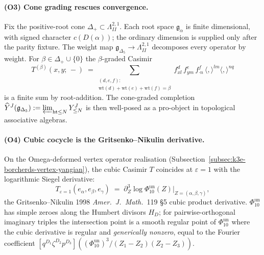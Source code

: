 \paragraph{(O3) Cone grading rescues convergence.}
Fix the positive-root cone $\Delta_+\subset\Lambda^{2,1}_{II}$. Each root space
$\mathfrak g_\alpha$ is finite dimensional, with signed character \(c(D(\alpha))\);
the ordinary dimension is supplied only after the parity fixture. The weight map
$\mathfrak g_{\Delta_5}\to\Lambda^{2,1}_{II}$ decomposes every operator by weight.
For $\beta\in\Delta_+\cup\{0\}$ the $\beta$-graded Casimir
\[
 T^{(\beta)}(x,y;\,-) \;=\!\!\sum_{\substack{(d,e,f):\\\mathrm{wt}(d)+\mathrm{wt}(e)+\mathrm{wt}(f)=\beta}}\!\!
 f^{d}_{xl}\,f^{e}_{ym}\,f^{f}_{\cdot n}\,\langle,\rangle^{lm}\langle,\rangle^{nq}
\]
is a finite sum by root-addition. The cone-graded completion
$\widehat Y^J(\mathfrak g_{\Delta_5}) := \varprojlim_{\mathrm{ht}\le N} Y^J_{\le N}$
is then well-posed as a pro-object in topological associative algebras.

\paragraph{(O4) Cubic cocycle is the Gritsenko--Nikulin derivative.}
On the Omega-deformed vertex operator realisation
(Subsection~\ref{subsec:k3e-borcherds-vertex-yangian}), the cubic Casimir
$T$ coincides at $\varepsilon=1$ with the logarithmic Siegel derivative:
\[
 T_{\varepsilon=1}(e_\alpha,e_\beta,e_\gamma)
 \;=\; \partial^3_Z\log\Phi_{10}^{\mathrm{un}}(Z)\big|_{Z=(\alpha,\beta,\gamma)},
\]
the Gritsenko--Nikulin 1998 \emph{Amer.\ J.\ Math.}~119 \S5 cubic product
derivative. \(\Phi_{10}^{\mathrm{un}}\) has simple zeroes along the Humbert divisors
$H_D$; for pairwise-orthogonal imaginary triples the intersection point
is a smooth regular point of \(\Phi_{10}^{\mathrm{un}}\) where the cubic derivative is
regular and \emph{generically nonzero}, equal to the Fourier coefficient
$[q^{D_1}\zeta^{D_2}p^{D_3}]((\Phi_{10}^{\mathrm{un}})^3 / (Z_1-Z_2)(Z_2-Z_3))$.

